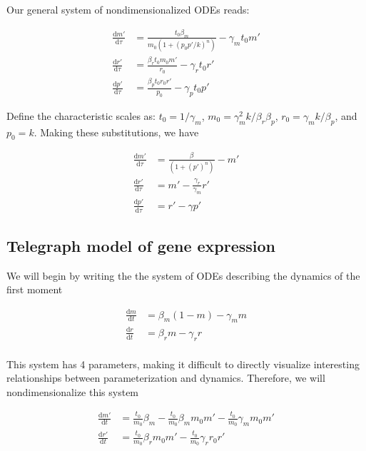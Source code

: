 \documentclass{ucetd}
\begin{document}
\begin{appendices}
Our general system of nondimensionalized ODEs reads:


\begin{align*}
\frac{\mathrm{d}m'}{\mathrm{d}\tau} &= \frac{t_0\beta_{m}}{m_0(1 + (p_{0}p'/k)^n)} - \gamma_m t_{0}m'\\
\frac{\mathrm{d}r'}{\mathrm{d}\tau} &= \frac{\beta_{r} t_{0}m_{0} m'}{r_0} - \gamma_r t_{0}r'\\
\frac{\mathrm{d}p'}{\mathrm{d}\tau} &= \frac{\beta_{p} t_{0}r_{0} r'}{p_{0}} - \gamma_{p} t_{0} p'
\end{align*}

Define the characteristic scales as: $t_{0} = 1/\gamma_{m}$, $m_{0}=\gamma_{m}^{2}k/\beta_{r}\beta_{p}$, $r_{0} = \gamma_{m}k/\beta_{p}$, and $p_{0} = k$. Making these substitutions, we have

\begin{align*}
\frac{\mathrm{d}m'}{\mathrm{d}\tau} &= \frac{\beta}{(1 + (p')^n)} - m'\\
\frac{\mathrm{d}r'}{\mathrm{d}\tau} &= m' - \frac{\gamma_{r}}{\gamma_{m}}r'\\
\frac{\mathrm{d}p'}{\mathrm{d}\tau} &= r' - \gamma p'
\end{align*}

\subsection{Telegraph model of gene expression}

We will begin by writing the the system of ODEs describing the dynamics of the first moment

\begin{align}
\frac{\mathrm{d}m}{\mathrm{d}t} &= \beta_{m}(1-m) - \gamma_m m\\
\frac{\mathrm{d}r}{\mathrm{d}t} &= \beta_{r} m - \gamma_r r\\
\end{align}

This system has 4 parameters, making it difficult to directly visualize interesting relationships between parameterization and dynamics. Therefore, we will nondimensionalize this system

\begin{align}
\frac{\mathrm{d}m'}{\mathrm{d}t} &= \frac{t_0}{m_0}\beta_{m} - \frac{t_0}{m_0}\beta_{m}m_{0}m' - \frac{t_0}{m_0}\gamma_m m_{0}m'\\
\frac{\mathrm{d}r'}{\mathrm{d}t} &= \frac{t_0}{m_0}\beta_{r} m_{0}m' - \frac{t_0}{m_0}\gamma_r r_{0}r'\\
\end{align}


\end{appendices}
\end{document}
